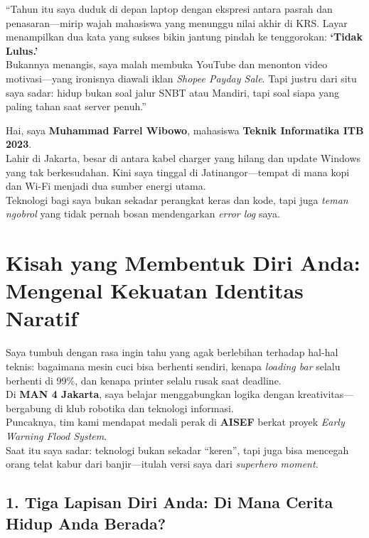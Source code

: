\documentclass[
  letterpaper,
  DIV=11,
  numbers=noendperiod]{scrreprt}
\begin{document}
``Tahun itu saya duduk di depan laptop dengan ekspresi antara pasrah dan
penasaran---mirip wajah mahasiswa yang menunggu nilai akhir di KRS.
Layar menampilkan dua kata yang sukses bikin jantung pindah ke
tenggorokan: \textbf{`Tidak Lulus.'}\\
Bukannya menangis, saya malah membuka YouTube dan menonton video
motivasi---yang ironisnya diawali iklan \emph{Shopee Payday Sale}. Tapi
justru dari situ saya sadar: hidup bukan soal jalur SNBT atau Mandiri,
tapi soal siapa yang paling tahan saat server penuh.''

Hai, saya \textbf{Muhammad Farrel Wibowo}, mahasiswa \textbf{Teknik
Informatika ITB 2023}.\\
Lahir di Jakarta, besar di antara kabel charger yang hilang dan update
Windows yang tak berkesudahan. Kini saya tinggal di Jatinangor---tempat
di mana kopi dan Wi-Fi menjadi dua sumber energi utama.\\
Teknologi bagi saya bukan sekadar perangkat keras dan kode, tapi juga
\emph{teman ngobrol} yang tidak pernah bosan mendengarkan \emph{error
log} saya.

\section{\texorpdfstring{\textbf{Kisah yang Membentuk Diri Anda:
Mengenal Kekuatan Identitas
Naratif}}{Kisah yang Membentuk Diri Anda: Mengenal Kekuatan Identitas Naratif}}\label{kisah-yang-membentuk-diri-anda-mengenal-kekuatan-identitas-naratif}

Saya tumbuh dengan rasa ingin tahu yang agak berlebihan terhadap hal-hal
teknis: bagaimana mesin cuci bisa berhenti sendiri, kenapa \emph{loading
bar} selalu berhenti di 99\%, dan kenapa printer selalu rusak saat
deadline.\\
Di \textbf{MAN 4 Jakarta}, saya belajar menggabungkan logika dengan
kreativitas---bergabung di klub robotika dan teknologi informasi.\\
Puncaknya, tim kami mendapat medali perak di \textbf{AISEF} berkat
proyek \emph{Early Warning Flood System}.\\
Saat itu saya sadar: teknologi bukan sekadar ``keren'', tapi juga bisa
mencegah orang telat kabur dari banjir---itulah versi saya dari
\emph{superhero moment.}

\subsection{\texorpdfstring{\textbf{1. Tiga Lapisan Diri Anda: Di Mana
Cerita Hidup Anda
Berada?}}{1. Tiga Lapisan Diri Anda: Di Mana Cerita Hidup Anda Berada?}}\label{tiga-lapisan-diri-anda-di-mana-cerita-hidup-anda-berada}
\end{document}
